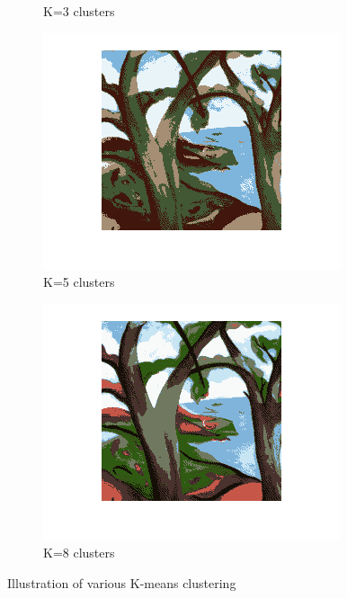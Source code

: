 \begin{figure}[ht]
\begin{subfigure}[b]{0.5\linewidth}
    \caption{K=3 clusters}
    \vspace{4ex}
  \end{subfigure} 
  \begin{subfigure}[b]{0.5\linewidth}
    \centering
    \includegraphics[width=0.75\linewidth]{figures/kmeans5.png}
    \caption{K=5 clusters} 
  \end{subfigure}%
  \begin{subfigure}[b]{0.5\linewidth}
    \centering
    \includegraphics[width=0.75\linewidth]{figures/kmeans8.png} 
    \caption{K=8 clusters} 
  \end{subfigure} 
  \caption{Illustration of various K-means clustering}
\end{figure}

